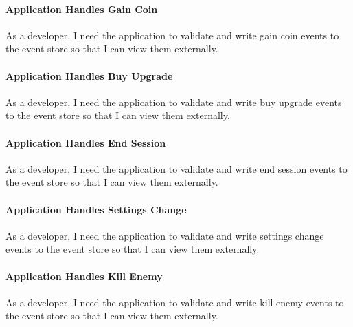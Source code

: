 \paragraph{Application Handles Gain Coin}
As a developer, I need the application to validate and write gain coin events to the event store so that I can view them externally.

\paragraph{Application Handles Buy Upgrade}
As a developer, I need the application to validate and write buy upgrade events to the event store so that I can view them externally.

\paragraph{Application Handles End Session}
As a developer, I need the application to validate and write end session events to the event store so that I can view them externally.

\paragraph{Application Handles Settings Change}
As a developer, I need the application to validate and write settings change events to the event store so that I can view them externally.

\paragraph{Application Handles Kill Enemy}
As a developer, I need the application to validate and write kill enemy events to the event store so that I can view them externally.

